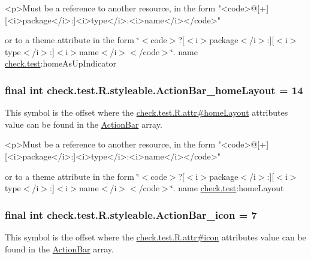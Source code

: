 \begin{DoxyVerb}      <p>Must be a reference to another resource, in the form "<code>@[+][<i>package</i>:]<i>type</i>:<i>name</i></code>"
\end{DoxyVerb}
 or to a theme attribute in the form \char`\"{}$<$code$>$?\mbox{[}$<$i$>$package$<$/i$>$\+:\mbox{]}\mbox{[}$<$i$>$type$<$/i$>$\+:\mbox{]}$<$i$>$name$<$/i$>$$<$/code$>$\char`\"{}.  name \hyperlink{namespacecheck_1_1test}{check.\+test}\+:home\+As\+Up\+Indicator \hypertarget{classcheck_1_1test_1_1_r_1_1styleable_a2036cd83e6c7153acfac1a87f273dbe5}{}
\subsubsection[{Action\+Bar\+\_\+home\+Layout}]{\setlength{\rightskip}{0pt plus 5cm}final int check.\+test.\+R.\+styleable.\+Action\+Bar\+\_\+home\+Layout = 14\hspace{0.3cm}{\ttfamily [static]}}\label{classcheck_1_1test_1_1_r_1_1styleable_a2036cd83e6c7153acfac1a87f273dbe5}
This symbol is the offset where the \hyperlink{classcheck_1_1test_1_1_r_1_1attr_a2ea41d239ed9fa5e737ac3d46fa3c567}{check.\+test.\+R.\+attr\#home\+Layout} attribute\textquotesingle{}s value can be found in the \hyperlink{classcheck_1_1test_1_1_r_1_1styleable_ad0a4d403cb244ea4d22c6f6ebf2c2cdf}{Action\+Bar} array.

\begin{DoxyVerb}      <p>Must be a reference to another resource, in the form "<code>@[+][<i>package</i>:]<i>type</i>:<i>name</i></code>"
\end{DoxyVerb}
 or to a theme attribute in the form \char`\"{}$<$code$>$?\mbox{[}$<$i$>$package$<$/i$>$\+:\mbox{]}\mbox{[}$<$i$>$type$<$/i$>$\+:\mbox{]}$<$i$>$name$<$/i$>$$<$/code$>$\char`\"{}.  name \hyperlink{namespacecheck_1_1test}{check.\+test}\+:home\+Layout \hypertarget{classcheck_1_1test_1_1_r_1_1styleable_a59d128f0d74801dcc8e66e1748460fed}{}
\subsubsection[{Action\+Bar\+\_\+icon}]{\setlength{\rightskip}{0pt plus 5cm}final int check.\+test.\+R.\+styleable.\+Action\+Bar\+\_\+icon = 7\hspace{0.3cm}{\ttfamily [static]}}\label{classcheck_1_1test_1_1_r_1_1styleable_a59d128f0d74801dcc8e66e1748460fed}
This symbol is the offset where the \hyperlink{classcheck_1_1test_1_1_r_1_1attr_a6cc6cb2d226afebb2e5d8eeb8175ad45}{check.\+test.\+R.\+attr\#icon} attribute\textquotesingle{}s value can be found in the \hyperlink{classcheck_1_1test_1_1_r_1_1styleable_ad0a4d403cb244ea4d22c6f6ebf2c2cdf}{Action\+Bar} array.

